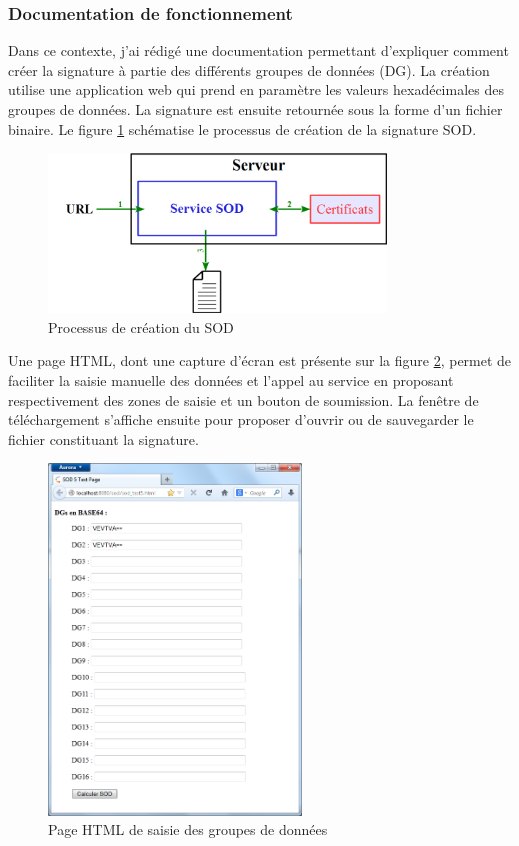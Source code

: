 
\subsubsection{Documentation de fonctionnement}
\label{Documentation de fonctionnement}

Dans ce contexte, j'ai rédigé une documentation permettant d'expliquer comment créer la signature à partie des différents groupes de données (DG).
La création utilise une application web qui prend en paramètre les valeurs hexadécimales des groupes de données.
La signature est ensuite retournée sous la forme d'un fichier binaire.
Le figure \ref{processus_SOD} schématise le processus de création de la signature SOD.
\begin{figure}[!h]
	\center
	\includegraphics[width=0.8\textwidth]{img/processus_SOD.png}
	\caption{Processus de création du SOD}
	\label{processus_SOD}
\end{figure}

Une page HTML, dont une capture d'écran est présente sur la figure \ref{saisie_DGs}, permet de faciliter la saisie manuelle des données et l'appel au service en proposant respectivement des zones de saisie et un bouton de soumission.
La fenêtre de téléchargement s'affiche ensuite pour proposer d'ouvrir ou de sauvegarder le fichier constituant la signature.
\begin{figure}[!h]
	\center
	\includegraphics[width=0.6\textwidth]{img/saisie_DGs.png}
	\caption{Page HTML de saisie des groupes de données}
	\label{saisie_DGs}
\end{figure}

